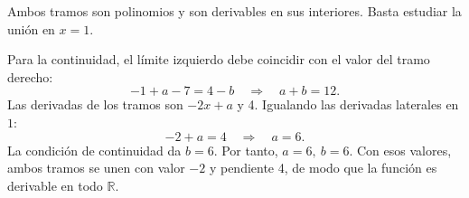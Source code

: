 Ambos tramos son polinomios y son derivables en sus interiores. Basta estudiar la unión en $x=1$.

Para la continuidad, el límite izquierdo debe coincidir con el valor del tramo derecho:
\[
 -1+a-7=4-b\quad\Longrightarrow\quad a+b=12.
\]
Las derivadas de los tramos son $-2x+a$ y 4. Igualando las derivadas laterales en $1$:
\[
 -2+a=4\quad\Longrightarrow\quad a=6.
\]
La condición de continuidad da $b=6$. Por tanto, $\boxed{a=6,\ b=6}$. Con esos valores, ambos tramos se unen con valor $-2$ y pendiente 4, de modo que la función es derivable en todo $\mathbb R$.
